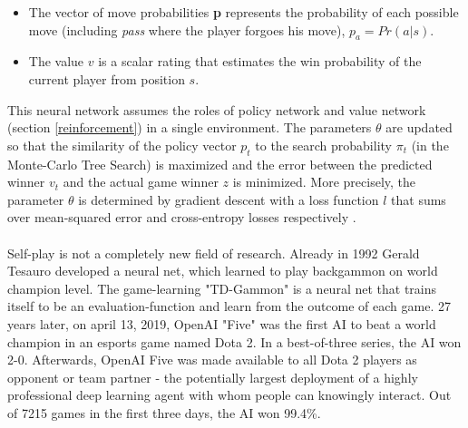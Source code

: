 \begin{description}

    \begin{itemize}
        \item The vector of move probabilities \textbf{p} represents the probability of each possible move (including \textit{pass} where the player forgoes his move), $p_a = Pr(a|s)$. 
        
        \item The value $v$ is a scalar rating that estimates the win probability of the current player from position $s$.
    \end{itemize}

\end{description}

This neural network assumes the roles of policy network and value network (section \ref{reinforcement}) in a single environment.  The parameters $\theta$ are updated so that the similarity of the policy vector \textbf{$p_t$} to the search probability \textbf{$\pi_t$} (in the Monte-Carlo Tree Search) is maximized and the error between the predicted winner $v_t$ and the actual game winner $z$ is minimized. More precisely, the parameter $\theta$ is determined by gradient descent with a loss function $l$ that sums over mean-squared error and cross-entropy losses respectively \cite{GoalphaGosilver2017mastering}.
\\
\\
Self-play is not a completely new field of research. Already in 1992 Gerald Tesauro \cite{TDGammontesauro1992practical,TD2Gammontesauro1995temporal} developed a neural net, which learned to play backgammon on world champion level. The game-learning "TD-Gammon" is a neural net that trains itself to be an evaluation-function and learn from the outcome of each game.
27 years later, on april 13, 2019, OpenAI "Five" was the first AI to beat a world champion in an esports game named Dota 2. In a best-of-three series, the AI won 2-0. Afterwards, OpenAI Five was made available to all Dota 2 players as opponent or team partner - the potentially largest deployment of a highly professional deep learning agent with whom people can knowingly interact. Out of 7215 games in the first three days, the AI won 99.4\%\cite{dotaOpenAI2019Jun}.\\ 
\\
